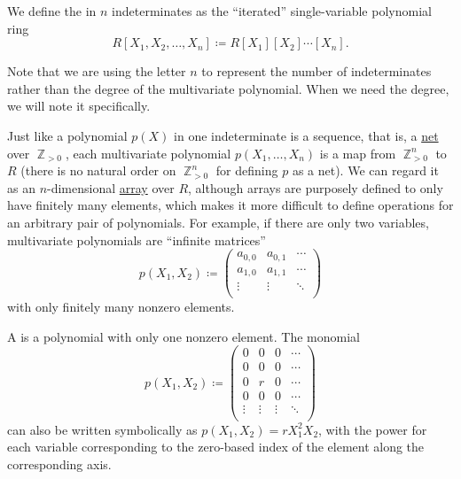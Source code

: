 \begin{definition}\label{def:multivariate_polynomial}
  We define the  in \( n \) indeterminates as the \enquote{iterated} single-variable polynomial ring
  \begin{equation*}
    R[X_1, X_2, \ldots, X_n] \coloneqq R[X_1][X_2] \cdots [X_n].
  \end{equation*}

  Note that we are using the letter \( n \) to represent the number of indeterminates rather than the degree of the multivariate polynomial. When we need the degree, we will note it specifically.

  Just like a polynomial \( p(X) \) in one indeterminate is a sequence, that is, a \hyperref[def:topological_net]{net} over \( \BbbZ_{>0} \), each multivariate polynomial \( p(X_1, \ldots, X_n) \) is a map from \( \BbbZ_{>0}^n \) to \( R \) (there is no natural order on \( \BbbZ_{>0}^n \) for defining \( p \) as a net). We can regard it as an \( n \)-dimensional \hyperref[def:array]{array} over \( R \), although arrays are purposely defined to only have finitely many elements, which makes it more difficult to define operations for an arbitrary pair of polynomials. For example, if there are only two variables, multivariate polynomials are \enquote{infinite matrices}
  \begin{equation*}
    p(X_1, X_2) \coloneqq \begin{pmatrix}
      a_{0,0} & a_{0,1} & \cdots \\
      a_{1,0} & a_{1,1} & \cdots \\
      \vdots  & \vdots  & \ddots \\
    \end{pmatrix}
  \end{equation*}
  with only finitely many nonzero elements.

  A  is a polynomial with only one nonzero element. The monomial
  \begin{equation*}
    p(X_1, X_2) \coloneqq \begin{pmatrix}
      0      & 0      & 0      & \cdots \\
      0      & 0      & 0      & \cdots \\
      0      & r      & 0      & \cdots \\
      0      & 0      & 0      & \cdots \\
      \vdots & \vdots & \vdots & \ddots \\
    \end{pmatrix}
  \end{equation*}
  can also be written symbolically as \( p(X_1, X_2) = r X_1^2 X_2 \), with the power for each variable corresponding to the zero-based index of the element along the corresponding axis.


\end{definition}
